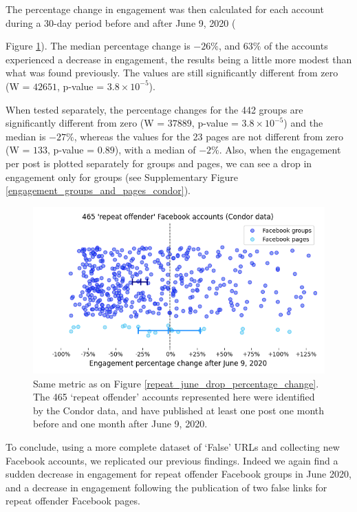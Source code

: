 \documentclass[review]{elsarticle}
\begin{document}
The percentage change in engagement was then calculated for each account during a 30-day period before and after June 9, 2020 ({Figure \ref{condor_june_drop_percentage_change}).
The median percentage change is $-26\%$, and $63\%$ of the accounts experienced a decrease in engagement, the results being a little more modest than what was found previously.
The values are still significantly different from zero (W = $42651$, p-value = $3.8 \times 10^{-5}$).

When tested separately, the percentage changes for the 442 groups are significantly different from zero (W = $37889$, p-value = $3.8 \times 10^{-5}$) and the median is $-27\%$, whereas the values for the 23 pages are not different from zero (W = $133$, p-value = $0.89$), with a median of $-2\%$.
Also, when the engagement per post is plotted separately for groups and pages, we can see a drop in engagement only for groups (see Supplementary Figure \ref{engagement_groups_and_pages_condor}).

\begin{figure}[!h]
\centering
\includegraphics[scale=0.5]{./../figure/condor_june_drop_percentage_change.png}
\caption{
Same metric as on Figure \ref{repeat_june_drop_percentage_change}.
The 465 `repeat offender' accounts represented here were identified by the Condor data, and have published at least one post one month before and one month after June 9, 2020.
}
\label{condor_june_drop_percentage_change}
\end{figure}

To conclude, using a more complete dataset of `False' URLs and collecting new Facebook accounts, we replicated our previous findings. 
Indeed we again find a sudden decrease in engagement for repeat offender Facebook groups in June 2020, and a decrease in engagement following the publication of two false links for repeat offender Facebook pages.

}
\end{document}
